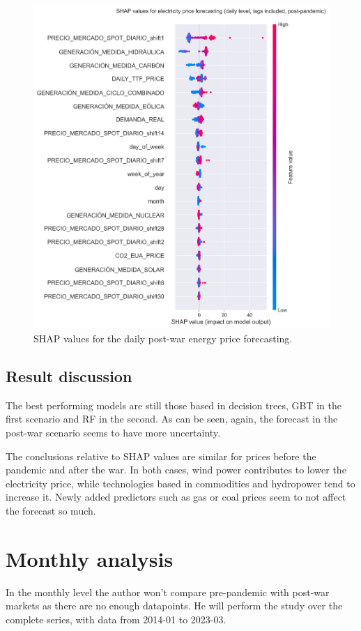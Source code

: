 \begin{figure}[H]
\centering
    \centering
    \includegraphics[width=0.7\linewidth]{images/analysis/shap-daily-post}
    \caption{SHAP values for the daily post-war energy price forecasting.}
    \label{fig:shap-daily-post}
\end{figure}

\subsection{Result discussion}

The best performing models are still those based in decision trees, GBT in the first scenario and RF in the second. As can be seen, again, the forecast in the post-war scenario seems to have more uncertainty.

The conclusions relative to SHAP values are similar for prices before the pandemic and after the war. In both cases, wind power contributes to lower the electricity price, while technologies based in commodities and hydropower tend to increase it. Newly added predictors such as gas or coal prices seem to not affect the forecast so much.

\newpage
\section{Monthly analysis}
In the monthly level the author won't compare pre-pandemic with post-war markets as there are no enough datapoints. He will perform the study over the complete series, with data from 2014-01 to 2023-03.

